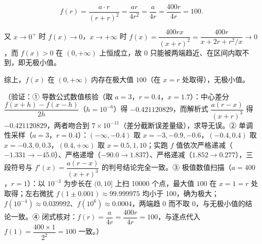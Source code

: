 \begin{answer}
\nopagebreak[4]
\[
f(r)=\dfrac{a\cdot r}{(r+r)^2}=\dfrac{ar}{4r^2}=\dfrac{a}{4r}=\dfrac{400r}{4r}=100 .
\]

又 \(x\to0^{+}\) 时 \(f(x)\to0\)，\(x\to+\infty\) 时 \(f(x)=\dfrac{400rx}{(x+r)^2}=\dfrac{400r}{x+2r+r^2/x}\to0\)，而 \(f(x)>0\) 在 \((0,+\infty)\) 上恒成立，故 \(0\) 只能被两端趋近、在区间内取不到，即无极小值。

综上，\(f(x)\) 在 \((0,+\infty)\) 内存在极大值 \(100\)（在 \(x=r\) 处取得），无极小值。

（验证：① 导数公式数值核验（取 \(a=3\)，\(r=0.4\)，\(x=1.7\)）：中心差分 \(\dfrac{f(x+h)-f(x-h)}{2h}\)（\(h=10^{-6}\)）得 \(-0.421120829\)，而解析式 \(\dfrac{a(r-x)}{(x+r)^3}\) 得 \(-0.421120829\)，两者吻合到 \(7\times10^{-11}\)（差分截断误差量级），求导无误。② 单调性采样（\(a=3\)，\(r=0.4\)）：\((-\infty,-0.4)\) 取 \(x=-3,-0.9,-0.6\)，\((-0.4,0.4)\) 取 \(x=-0.3,0,0.3\)，\((0.4,+\infty)\) 取 \(x=0.5,1,10\)；实跑 \(f\) 值依次严格递减（\(-1.331\to-45.0\)）、严格递增（\(-90.0\to1.837\)）、严格递减（\(1.852\to0.277\)），三段符号与 \(f'(x)=\dfrac{a(r-x)}{(x+r)^3}\) 的判号结论完全一致。③ 极值数值扫描（\(a=400\)，\(r=1\)）：以 \(10^{-3}\) 为步长在 \((0,10]\) 上扫 10000 个点，最大值 \(100\) 在 \(x=1=r\) 处取得；左右微扰 \(f(1\pm0.001)\approx 99.999975\) 均小于 100，确为极大；\(f(10^{-4})\approx 0.039992\)、\(f(10^{6})\approx 0.0004\)，两端趋 \(0\) 而不取 \(0\)，与无极小值的结论一致。④ 闭式核对：\(f(r)=\dfrac{a}{4r}=\dfrac{400r}{4r}=100\)，与逐点代入 \(f(1)=\dfrac{400\times1}{2^2}=100\) 一致。）



\end{answer}